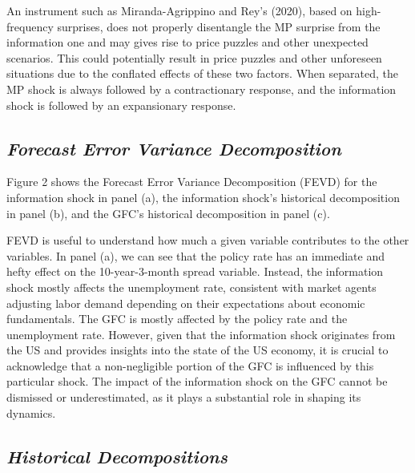 \documentclass[11pt,a4paper]{article}
\begin{document}
An instrument such as Miranda-Agrippino and Rey's (2020), based on high-frequency surprises, does not properly disentangle the MP surprise from the information one and may gives rise to price puzzles and other unexpected scenarios. This could potentially result in price puzzles and other unforeseen situations due to the conflated effects of these two factors. When separated, the MP shock is always followed by a contractionary response, and the information shock is followed by an expansionary response.
    
\subsection{\textit{Forecast Error Variance Decomposition}}
Figure 2 shows the Forecast Error Variance Decomposition (FEVD) for the information shock in panel (a), the information shock's historical decomposition in panel (b), and the GFC's historical decomposition in panel (c).

FEVD is useful to understand how much a given variable contributes to the other variables. In panel (a), we can see that the policy rate has an immediate and hefty effect on the 10-year-3-month spread variable. Instead, the information shock mostly affects the unemployment rate, consistent with market agents adjusting labor demand depending on their expectations about economic fundamentals.
The GFC is mostly affected by the policy rate and the unemployment rate. 
However, given that the information shock originates from the US and provides insights into the state of the US economy, it is crucial to acknowledge that a non-negligible portion of the GFC is influenced by this particular shock. The impact of the information shock on the GFC cannot be dismissed or underestimated, as it plays a substantial role in shaping its dynamics.

\subsection{\textit{Historical Decompositions}}
\end{document}
